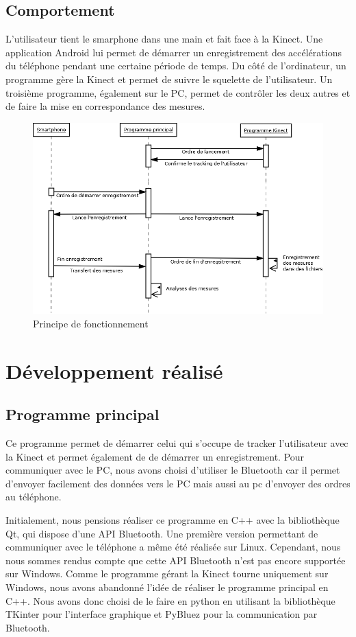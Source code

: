 \documentclass[12pt, french]{article}
\begin{document}
\subsection{Comportement}
L'utilisateur tient le smarphone dans une main et fait face à la Kinect. Une application Android lui permet de démarrer un enregistrement des accélérations du téléphone pendant une certaine période de temps. Du côté de l'ordinateur, un programme gère la Kinect et permet de suivre le squelette de l'utilisateur. Un troisième programme, également sur le PC, permet de contrôler les deux autres et de faire la mise en correspondance des mesures.

\begin{figure}[H]
\centering
\includegraphics[scale=0.35]{diagramme_com.png}
\caption{Principe de fonctionnement}
\label{fig0}
\end{figure}

\section{Développement réalisé}

\subsection{Programme principal}
Ce programme permet de démarrer celui qui s'occupe de tracker l'utilisateur avec la Kinect et permet également de de démarrer un enregistrement.
Pour communiquer avec le PC, nous avons choisi d'utiliser le Bluetooth car il permet d'envoyer facilement des données vers le PC mais aussi au pc d'envoyer des ordres au téléphone.

Initialement, nous pensions réaliser ce programme en C++ avec la bibliothèque Qt, qui dispose d'une API Bluetooth. Une première version permettant de communiquer avec le téléphone a même été réalisée sur Linux. Cependant, nous nous sommes rendus compte que cette API Bluetooth n'est pas encore supportée sur Windows. Comme le programme gérant la Kinect tourne uniquement sur Windows, nous avons abandonné l'idée de réaliser le programme principal en C++. Nous avons donc choisi de le faire en python en utilisant la bibliothèque TKinter pour l'interface graphique et PyBluez pour la communication par Bluetooth.
\end{document}
